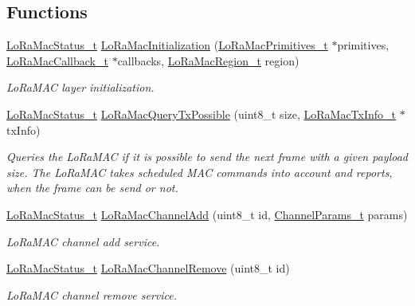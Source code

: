 \subsection*{Functions}
\begin{DoxyCompactItemize}
\item 
\hyperlink{group__LORAMAC_ga30bd25657e10480f8605ee951b0ecfbd}{Lo\+Ra\+Mac\+Status\+\_\+t} \hyperlink{group__LORAMAC_ga7ca445cf825e45999810b3991273eba5}{Lo\+Ra\+Mac\+Initialization} (\hyperlink{group__LORAMAC_gafc0443f59f49d8597c0accb5e6074c44}{Lo\+Ra\+Mac\+Primitives\+\_\+t} $\ast$primitives, \hyperlink{group__LORAMAC_ga2899a8ebbefe08452ddf89e14159a160}{Lo\+Ra\+Mac\+Callback\+\_\+t} $\ast$callbacks, \hyperlink{group__LORAMAC_ga80c48efda9ae02e14b58160d34a798dd}{Lo\+Ra\+Mac\+Region\+\_\+t} region)
\begin{DoxyCompactList}\small\item\em Lo\+Ra\+M\+AC layer initialization. \end{DoxyCompactList}\item 
\hyperlink{group__LORAMAC_ga30bd25657e10480f8605ee951b0ecfbd}{Lo\+Ra\+Mac\+Status\+\_\+t} \hyperlink{group__LORAMAC_ga8b0aeaf75f9404ce01da9b202252c231}{Lo\+Ra\+Mac\+Query\+Tx\+Possible} (uint8\+\_\+t size, \hyperlink{group__LORAMAC_ga3219fea2f3c3355f80d2ed29db613683}{Lo\+Ra\+Mac\+Tx\+Info\+\_\+t} $\ast$tx\+Info)
\begin{DoxyCompactList}\small\item\em Queries the Lo\+Ra\+M\+AC if it is possible to send the next frame with a given payload size. The Lo\+Ra\+M\+AC takes scheduled M\+AC commands into account and reports, when the frame can be send or not. \end{DoxyCompactList}\item 
\hyperlink{group__LORAMAC_ga30bd25657e10480f8605ee951b0ecfbd}{Lo\+Ra\+Mac\+Status\+\_\+t} \hyperlink{group__LORAMAC_gad74920538f07f34e773ca5de9ec89370}{Lo\+Ra\+Mac\+Channel\+Add} (uint8\+\_\+t id, \hyperlink{group__LORAMAC_ga1360ca6f82c6d125ea43a9dad9b56184}{Channel\+Params\+\_\+t} params)
\begin{DoxyCompactList}\small\item\em Lo\+Ra\+M\+AC channel add service. \end{DoxyCompactList}\item 
\hyperlink{group__LORAMAC_ga30bd25657e10480f8605ee951b0ecfbd}{Lo\+Ra\+Mac\+Status\+\_\+t} \hyperlink{group__LORAMAC_gafad6c929a33557ac2fd4000bcacd9453}{Lo\+Ra\+Mac\+Channel\+Remove} (uint8\+\_\+t id)
\begin{DoxyCompactList}\small\item\em Lo\+Ra\+M\+AC channel remove service. \end{DoxyCompactList}\item 

\end{DoxyCompactItemize}
